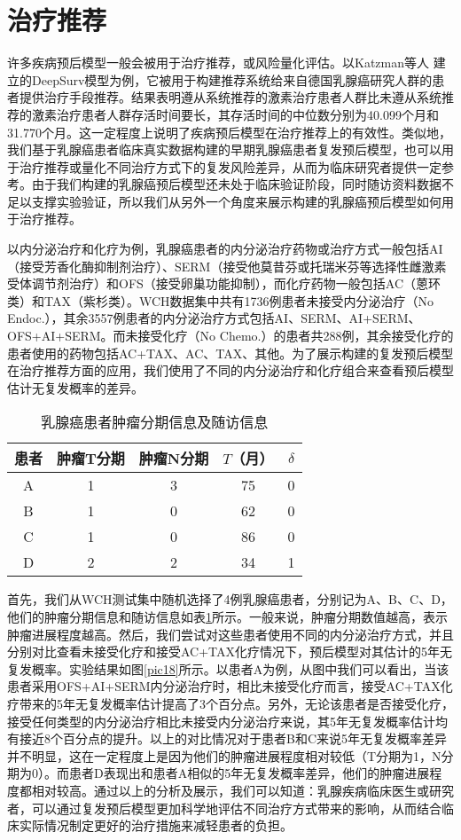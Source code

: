 \section{治疗推荐}
许多疾病预后模型一般会被用于治疗推荐，或风险量化评估。以Katzman等人 建立的DeepSurv模型为例，它被用于构建推荐系统给来自德国乳腺癌研究人群的患者提供治疗手段推荐。结果表明遵从系统推荐的激素治疗患者人群比未遵从系统推荐的激素治疗患者人群存活时间要长，其存活时间的中位数分别为40.099个月和31.770个月。这一定程度上说明了疾病预后模型在治疗推荐上的有效性。类似地，我们基于乳腺癌患者临床真实数据构建的早期乳腺癌患者复发预后模型，也可以用于治疗推荐或量化不同治疗方式下的复发风险差异，从而为临床研究者提供一定参考。由于我们构建的乳腺癌预后模型还未处于临床验证阶段，同时随访资料数据不足以支撑实验验证，所以我们从另外一个角度来展示构建的乳腺癌预后模型如何用于治疗推荐。

以内分泌治疗和化疗为例，乳腺癌患者的内分泌治疗药物或治疗方式一般包括AI（接受芳香化酶抑制剂治疗）、SERM（接受他莫昔芬或托瑞米芬等选择性雌激素受体调节剂治疗）和OFS（接受卵巢功能抑制），而化疗药物一般包括AC（蒽环类）和TAX（紫杉类）。WCH数据集中共有1736例患者未接受内分泌治疗（No Endoc.），其余3557例患者的内分泌治疗方式包括AI、SERM、AI+SERM、OFS+AI+SERM。而未接受化疗（No Chemo.）的患者共288例，其余接受化疗的患者使用的药物包括AC+TAX、AC、TAX、其他。为了展示构建的复发预后模型在治疗推荐方面的应用，我们使用了不同的内分泌治疗和化疗组合来查看预后模型估计无复发概率的差异。

\begin{table}[H]
\caption{乳腺癌患者肿瘤分期信息及随访信息}
\begin{tabular}{ccccc}
\toprule
患者 & 肿瘤T分期 & 肿瘤N分期 & $T$（月） & $\delta$ \\ 
\midrule
A & 1 & 3 & 75 & 0 \\
B & 1 & 0 & 62 & 0 \\
C & 1 & 0 & 86 & 0 \\
D & 2 & 2 & 34 & 1 \\
\bottomrule
\end{tabular}
\label{table06}
\end{table}

首先，我们从WCH测试集中随机选择了4例乳腺癌患者，分别记为A、B、C、D，他们的肿瘤分期信息和随访信息如表\ref{table06}所示。一般来说，肿瘤分期数值越高，表示肿瘤进展程度越高。然后，我们尝试对这些患者使用不同的内分泌治疗方式，并且分别对比查看未接受化疗和接受AC+TAX化疗情况下，预后模型对其估计的5年无复发概率。实验结果如图\ref{pic18}所示。以患者A为例，从图中我们可以看出，当该患者采用OFS+AI+SERM内分泌治疗时，相比未接受化疗而言，接受AC+TAX化疗带来的5年无复发概率估计提高了3个百分点。另外，无论该患者是否接受化疗，接受任何类型的内分泌治疗相比未接受内分泌治疗来说，其5年无复发概率估计均有接近8个百分点的提升。以上的对比情况对于患者B和C来说5年无复发概率差异并不明显，这在一定程度上是因为他们的肿瘤进展程度相对较低（T分期为1，N分期为0）。而患者D表现出和患者A相似的5年无复发概率差异，他们的肿瘤进展程度都相对较高。通过以上的分析及展示，我们可以知道：乳腺疾病临床医生或研究者，可以通过复发预后模型更加科学地评估不同治疗方式带来的影响，从而结合临床实际情况制定更好的治疗措施来减轻患者的负担。

